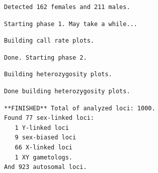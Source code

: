 \documentclass[
  letterpaper,
  DIV=11,
  numbers=noendperiod]{scrreprt}
\let\textttOrig\texttt
\renewcommand{\texttt}[1]{\textttOrig{\color{blue}{#1}}}
\begin{document}
\begin{verbatim}
Detected 162 females and 211 males.
\end{verbatim}

\begin{verbatim}
Starting phase 1. May take a while...
\end{verbatim}

\begin{verbatim}
Building call rate plots.
\end{verbatim}

\begin{figure}[H]

{\centering \texttt{[image: Session10\_SexLinkedMarkers\_files/figure-pdf/unnamed-chunk-7-1.pdf]}

}

\end{figure}

\begin{verbatim}
Done. Starting phase 2.
\end{verbatim}

\begin{verbatim}
Building heterozygosity plots.
\end{verbatim}

\begin{figure}[H]

{\centering \texttt{[image: Session10\_SexLinkedMarkers\_files/figure-pdf/unnamed-chunk-7-2.pdf]}

}

\end{figure}

\begin{figure}[H]

{\centering \texttt{[image: Session10\_SexLinkedMarkers\_files/figure-pdf/unnamed-chunk-7-3.pdf]}

}

\end{figure}

\begin{verbatim}
Done building heterozygosity plots.
\end{verbatim}

\begin{verbatim}
**FINISHED** Total of analyzed loci: 1000.
Found 77 sex-linked loci:
   1 Y-linked loci
   9 sex-biased loci
   66 X-linked loci
   1 XY gametologs.
And 923 autosomal loci.
\end{verbatim}

\begin{figure}[H]

{\centering \texttt{[image: Session10\_SexLinkedMarkers\_files/figure-pdf/unnamed-chunk-7-4.pdf]}

}

\end{figure}
\end{document}
